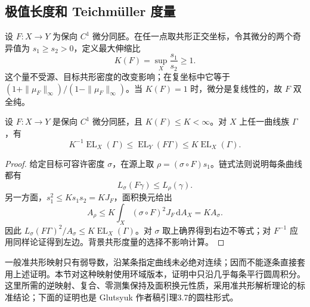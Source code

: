 \subsection{极值长度和 Teichmüller 度量}
\label{g4:subsec:0604:02}

设 \(F:X\to Y\) 为保向 \(C^1\) 微分同胚。在任一点取共形正交坐标，令其微分的两个奇异值为 \(s_1\ge s_2>0\)，定义最大伸缩比
\[
	K(F)=\sup_X\frac{s_1}{s_2}\ge1.
\]
这个量不受源、目标共形密度的改变影响；在复坐标中它等于 \((1+\|\mu_F\|_\infty)/(1-\|\mu_F\|_\infty)\)。当 \(K(F)=1\) 时，微分是复线性的，故 \(F\) 双全纯。

\begin{proposition}
	\label{g4:prop:0604:extremal-qc}
	设 \(F:X\to Y\) 是保向 \(C^1\) 微分同胚，且 \(K(F)\le K<\infty\)。对 \(X\) 上任一曲线族 \(\Gamma\)，有
	\[
		K^{-1}\operatorname{EL}_X(\Gamma)
		\le\operatorname{EL}_Y(F\Gamma)
		\le K\operatorname{EL}_X(\Gamma).
	\]
\end{proposition}
\begin{proof}
	给定目标可容许密度 \(\sigma\)，在源上取 \(\rho=(\sigma\circ F)s_1\)。链式法则说明每条曲线都有
	\[
		L_\sigma(F\gamma)\le L_\rho(\gamma).
	\]
	另一方面，\(s_1^2\le K s_1s_2=KJ_F\)，面积换元给出
	\[
		A_\rho\le K\int_X(\sigma\circ F)^2J_F\,\mathrm{d}A_X
		=KA_\sigma.
	\]
	因此 \(L_\sigma(F\Gamma)^2/A_\sigma\le K\operatorname{EL}_X(\Gamma)\)。对 \(\sigma\) 取上确界得到右边不等式；对 \(F^{-1}\) 应用同样论证得到左边。背景共形度量的选择不影响计算。
\end{proof}

一般准共形映射只有弱导数，沿某条指定曲线未必绝对连续；因而不能逐条直接套用上述证明。本节对这种映射使用环域版本，证明中只沿几乎每条平行圆周积分。这里所需的逆映射、复合、零测集保持及面积换元性质，采用准共形解析理论的标准结论；下面的证明也是 Glutsyuk 作者稿引理3.7的圆柱形式。\cite[作者稿第12页，引理3.7；群性质与零测集保持见第3.4节]{Glutsyuk2008Uniformization}


